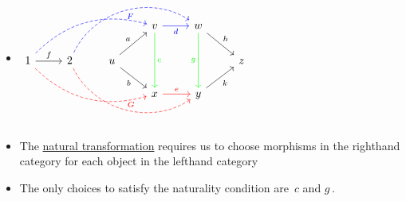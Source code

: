 \begin{itemize}
    \item $\begin{tikzcd}                                                                            &                                                                                &                                    & v\arrow[blue,r, "d"'] \arrow[green,dd, "c"] & w \arrow[rd, "h"] \arrow[green,dd,"g"'] &   \\1 \arrow[r, "f"] \arrow[blue,rrru, dashed, bend left] \arrow[red,rrrd,dashed, bend right] & 2 \arrow[blue,rrru, "F"', dashed, bend left=49]\arrow[red,rrrd, "G", dashed, bend right=49] & u \arrow[ru, "a"]\arrow[rd, "b"'] &                                  &                                    & z \\                                                                                &                                                                                    &                                    & x\arrow[red,r, "e"]                  & y \arrow[ru,"k"']                 &  \end{tikzcd}$
    \item The \hyperref[D3.49]{natural transformation} requires us to choose morphisms in the righthand category for each object in the lefthand category
    \item The only choices to satisfy the naturality condition are \,$c$ and $g$\,.
  \end{itemize}
